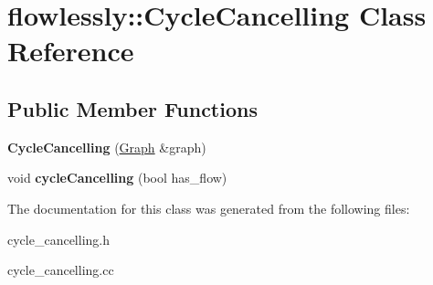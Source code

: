\hypertarget{classflowlessly_1_1CycleCancelling}{\section{flowlessly\-:\-:\-Cycle\-Cancelling \-Class \-Reference}
\label{classflowlessly_1_1CycleCancelling}
}
\subsection*{\-Public \-Member \-Functions}
\begin{DoxyCompactItemize}
\item 
\hypertarget{classflowlessly_1_1CycleCancelling_a34f918427568158bd8162de5f4bc7701}{{\bfseries \-Cycle\-Cancelling} (\hyperlink{classflowlessly_1_1Graph}{\-Graph} \&graph)}\label{classflowlessly_1_1CycleCancelling_a34f918427568158bd8162de5f4bc7701}

\item 
\hypertarget{classflowlessly_1_1CycleCancelling_a6449dd761ba62fb50f73d070ca2bd164}{void {\bfseries cycle\-Cancelling} (bool has\-\_\-flow)}\label{classflowlessly_1_1CycleCancelling_a6449dd761ba62fb50f73d070ca2bd164}

\end{DoxyCompactItemize}


\-The documentation for this class was generated from the following files\-:\begin{DoxyCompactItemize}
\item 
cycle\-\_\-cancelling.\-h\item 
cycle\-\_\-cancelling.\-cc\end{DoxyCompactItemize}
